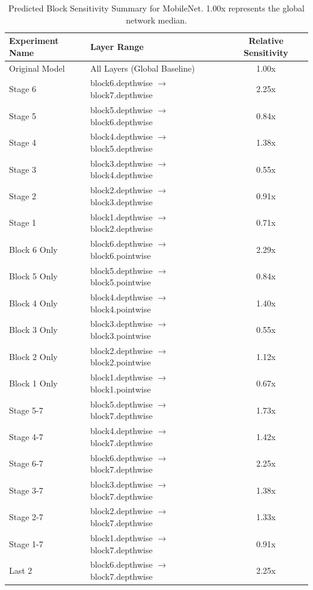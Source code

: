 \begin{table}[h]
\caption{Predicted Block Sensitivity Summary for MobileNet. 1.00x represents the global network median.}
\label{tab:rel_sens_summary_mobilenet}
\begin{tabular}{llc}
\toprule
Experiment Name & Layer Range & Relative Sensitivity \\
\midrule
Original Model & All Layers (Global Baseline) & 1.00x \\
Stage 6 & block6.depthwise $\to$ block7.depthwise & 2.25x \\
Stage 5 & block5.depthwise $\to$ block6.depthwise & 0.84x \\
Stage 4 & block4.depthwise $\to$ block5.depthwise & 1.38x \\
Stage 3 & block3.depthwise $\to$ block4.depthwise & 0.55x \\
Stage 2 & block2.depthwise $\to$ block3.depthwise & 0.91x \\
Stage 1 & block1.depthwise $\to$ block2.depthwise & 0.71x \\
Block 6 Only & block6.depthwise $\to$ block6.pointwise & 2.29x \\
Block 5 Only & block5.depthwise $\to$ block5.pointwise & 0.84x \\
Block 4 Only & block4.depthwise $\to$ block4.pointwise & 1.40x \\
Block 3 Only & block3.depthwise $\to$ block3.pointwise & 0.55x \\
Block 2 Only & block2.depthwise $\to$ block2.pointwise & 1.12x \\
Block 1 Only & block1.depthwise $\to$ block1.pointwise & 0.67x \\
Stage 5-7 & block5.depthwise $\to$ block7.depthwise & 1.73x \\
Stage 4-7 & block4.depthwise $\to$ block7.depthwise & 1.42x \\
Stage 6-7 & block6.depthwise $\to$ block7.depthwise & 2.25x \\
Stage 3-7 & block3.depthwise $\to$ block7.depthwise & 1.38x \\
Stage 2-7 & block2.depthwise $\to$ block7.depthwise & 1.33x \\
Stage 1-7 & block1.depthwise $\to$ block7.depthwise & 0.91x \\
Last 2 & block6.depthwise $\to$ block7.depthwise & 2.25x \\
\bottomrule
\end{tabular}
\end{table}
